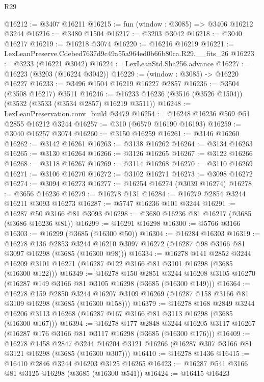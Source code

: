 \begin{lexlean}{R29}
\begin{coremodule}
@16212 := @3407 @16211
@16215 := fun (window : @3085) => @3406 @16212 @3244
@16216 := @3480 @1504
@16217 := @3203 @3042
@16218 := @3040 @16217
@16219 := @16218 @3074
@16220 := @16216 @16219
@16221 := LexLeanPreserve.Cdebed7637d9c49a55a964ed0b66b80ca.R29.__fits_26
@16223 := @3233 (@16221 @3042)
@16224 := LexLeanStd.Sha256.advance
@16227 := @16223 (@3203 (@16224 @3042))
@16229 := (window : @3085) -> @16220 @16227
@16233 := @3496 @1504 @16219 @16227 @2857
@16236 := @3504 (@3508 @16217) @3511
@16246 := @16233 @16236 (@3516 (@3526 @1504)) (@3532 (@3533 (@3534 @2857) @16219 @3511))
@16248 := LexLeanPreservation.conv_build @3479
@16254 := @16248 @16236 @569 @51 @2855 @16212 @3244
@16257 := @310 (@6579 @16190 @16193)
@16259 := @3040 @16257 @3074
@16260 := @3150 @16259
@16261 := @3146 @16260
@16262 := @3142 @16261
@16263 := @3138 @16262
@16264 := @3134 @16263
@16265 := @3130 @16264
@16266 := @3126 @16265
@16267 := @3122 @16266
@16268 := @3118 @16267
@16269 := @3114 @16268
@16270 := @3110 @16269
@16271 := @3106 @16270
@16272 := @3102 @16271
@16273 := @3098 @16272
@16274 := @3094 @16273
@16277 := @16254 @16274 (@3039 @16274)
@16278 := @3656 @16236
@16279 := @16278 @131
@16284 := @16279 @2854 @3244 @16211 @3093 @16273
@16287 := @5747 @16236 @101 @3244
@16291 := @16287 @50 @3166 @81 @3093
@16298 := @3680 @16236 @81 @16217 (@3685 (@3686 @16236 @81))
@16299 := @16291 @16298
@16300 := @5766 @3166
@16303 := @16299 (@3685 (@16300 @50))
@16304 := @16284 @16303
@16319 := @16278
    @136
    @2853
    @3244
    @16210
    @3097
    @16272
    (@16287 @98 @3166 @81 @3097 @16298 (@3685 (@16300 @98)))
@16334 := @16278
    @141
    @2852
    @3244
    @16209
    @3101
    @16271
    (@16287 @122 @3166 @81 @3101 @16298 (@3685 (@16300 @122)))
@16349 := @16278
    @150
    @2851
    @3244
    @16208
    @3105
    @16270
    (@16287 @149 @3166 @81 @3105 @16298 (@3685 (@16300 @149)))
@16364 := @16278
    @159
    @2850
    @3244
    @16207
    @3109
    @16269
    (@16287 @158 @3166 @81 @3109 @16298 (@3685 (@16300 @158)))
@16379 := @16278
    @168
    @2849
    @3244
    @16206
    @3113
    @16268
    (@16287 @167 @3166 @81 @3113 @16298 (@3685 (@16300 @167)))
@16394 := @16278
    @177
    @2848
    @3244
    @16205
    @3117
    @16267
    (@16287 @176 @3166 @81 @3117 @16298 (@3685 (@16300 @176)))
@16409 := @16278
    @1458
    @2847
    @3244
    @16204
    @3121
    @16266
    (@16287 @307 @3166 @81 @3121 @16298 (@3685 (@16300 @307)))
@16410 := @16278 @1436
@16415 := @16410 @2846 @3244 @16203 @3125 @16265
@16423 := @16287 @541 @3166 @81 @3125 @16298 (@3685 (@16300 @541))
@16424 := @16415 @16423

\end{coremodule}
\end{lexlean}
